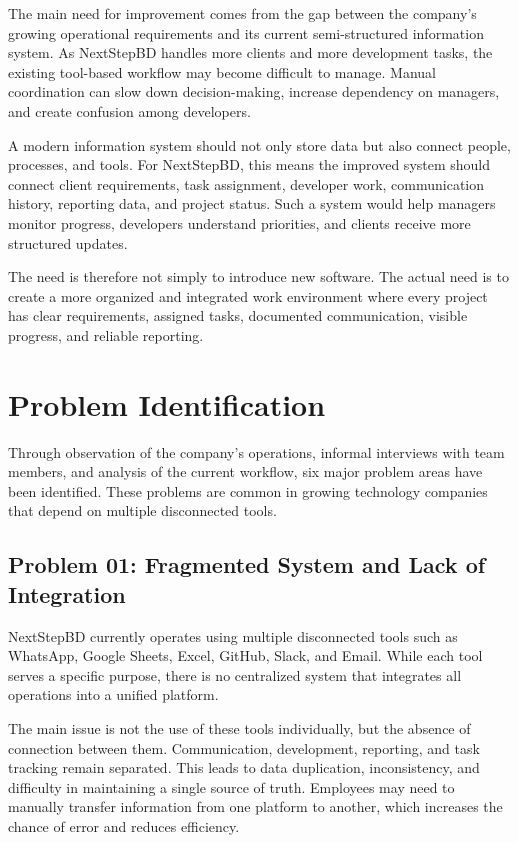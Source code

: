 \documentclass[12pt,a4paper]{report}
\begin{document}
The main need for improvement comes from the gap between the company’s growing operational requirements and its current semi-structured information system. As NextStepBD handles more clients and more development tasks, the existing tool-based workflow may become difficult to manage. Manual coordination can slow down decision-making, increase dependency on managers, and create confusion among developers.

A modern information system should not only store data but also connect people, processes, and tools. For NextStepBD, this means the improved system should connect client requirements, task assignment, developer work, communication history, reporting data, and project status. Such a system would help managers monitor progress, developers understand priorities, and clients receive more structured updates.

The need is therefore not simply to introduce new software. The actual need is to create a more organized and integrated work environment where every project has clear requirements, assigned tasks, documented communication, visible progress, and reliable reporting.

\section{Problem Identification}

Through observation of the company’s operations, informal interviews with team members, and analysis of the current workflow, six major problem areas have been identified. These problems are common in growing technology companies that depend on multiple disconnected tools.

\subsection{Problem 01: Fragmented System and Lack of Integration}

\begin{problemBox}
NextStepBD currently operates using multiple disconnected tools such as WhatsApp, Google Sheets, Excel, GitHub, Slack, and Email. While each tool serves a specific purpose, there is no centralized system that integrates all operations into a unified platform.
\end{problemBox}

The main issue is not the use of these tools individually, but the absence of connection between them. Communication, development, reporting, and task tracking remain separated. This leads to data duplication, inconsistency, and difficulty in maintaining a single source of truth. Employees may need to manually transfer information from one platform to another, which increases the chance of error and reduces efficiency.
\end{document}
